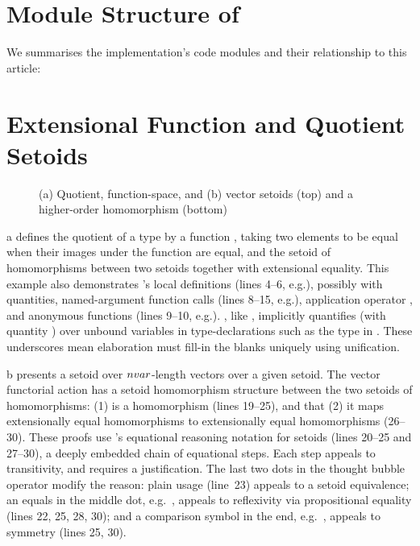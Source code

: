 \section{Module Structure of \Frexlib{}}\label{app:first-appendix}
We summarises the implementation's code modules
and their relationship to this article:


\section{Extensional Function and Quotient Setoids}
\label{sec:setoid example}
\begin{figure}
  \caption{(a) Quotient, function-space, and (b) vector setoids (top) and a higher-order homomorphism (bottom)}
\end{figure}
a defines the quotient of a type by a
function \QuotientingMap{}, taking two elements to be equal when their
images under the function  are equal, and
the setoid of homomorphisms
between two setoids together with extensional equality.  This example
also demonstrates \idris's local definitions (lines 4--6, e.g.), possibly
with quantities, named-argument function calls (lines 8--15, e.g.), application operator \IdrisBound{\$},
and
anonymous functions (lines 9--10, e.g.). \idris, like \Haskell, implicitly
quantifies (with quantity ) over unbound variables in
type-declarations such as the type \ImplicitArg{} in \QuotientName{}.
These underscores mean elaboration must fill-in the blanks
uniquely using unification.


b presents a setoid over $\nvar$-length
vectors over a given setoid. The vector functorial action
\VectMapName{} has a setoid homomorphism structure
between the two setoids of homomorphisms: (1) \VectMapF{} is a homomorphism (lines 19--25), and
that (2) it maps extensionally equal homomorphisms to extensionally
equal homomorphisms (26--30). These proofs use \idris's equational
reasoning notation for setoids (lines 20--25 and 27--30), a
deeply embedded chain of equational steps. Each step
\IdrisData{(\KatlaTilde\KatlaTilde)} appeals to
transitivity, and requires a justification. The last two dots in the
thought bubble operator \BasicThoughtBubble{} modify the reason:
plain usage (line~23) appeals to a setoid equivalence;
an
equals in the middle dot, e.g.~\EqualThoughtBubble{}, appeals to reflexivity via propositional equality (lines 22, 25, 28, 30); and
a comparison symbol in the end, e.g.~\EqualSymThoughtBubble{}, appeals to
symmetry (lines 25, 30).


